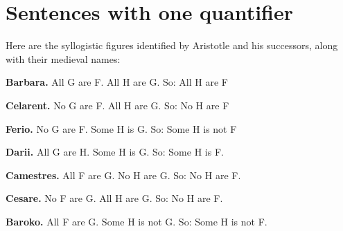 
\setcounter{chapter}{21}
\chapter{Sentences with one quantifier}\label{s:MoreMonadic}\setcounter{ProbPart}{0}
\problempart
\label{pr.BarbaraEtc}
Here are the syllogistic figures identified by Aristotle and his successors, along with their medieval names:
\begin{ebullet}
	\item \textbf{Barbara.} All G are F. All H are G. So:  All H are F
	\item[] 
	\item \textbf{Celarent.} No G are F. All H are G. So: No H are F
	\item[] 
	\item \textbf{Ferio.} No G are F. Some H is G. So: Some H is not F
	\item[] 
	\item \textbf{Darii.} All G are H. Some H is G. So: Some H is F.
	\item[] 
	\item \textbf{Camestres.} All F are G. No H are G. So: No H are F.
	\item[] 
	\item \textbf{Cesare.} No F are G. All H are G. So: No H are F.
	\item[] 
	\item \textbf{Baroko.} All F are G. Some H is not G. So: Some H is not F.
	\item[] 

\end{ebullet}

